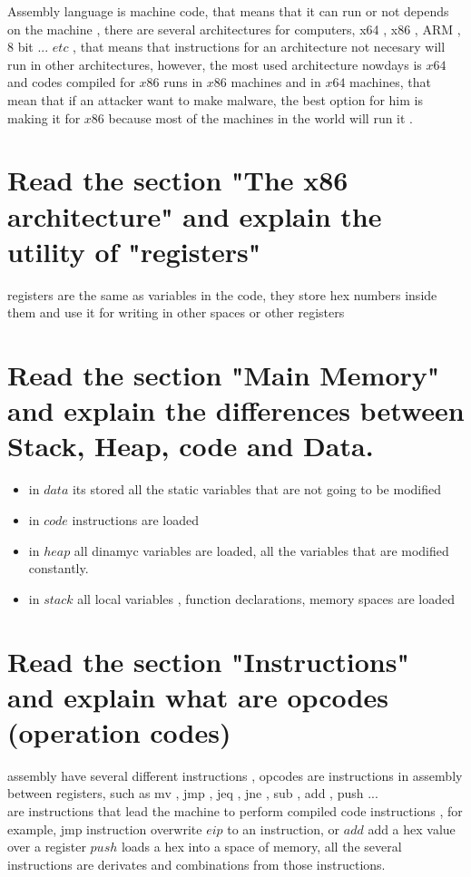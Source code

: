 \documentclass[10pt,a4paper]{article} %
\begin{document}
        Assembly language is machine code, that means that it can run or not
        depends on the machine , there are several architectures for computers,
        x64 , x86 , ARM , 8 bit ... $ etc  $  , that means that instructions
        for an architecture not necesary will run in other architectures,
        however, the most used architecture nowdays is $ x64  $  and codes
        compiled for $ x86  $ runs in $ x86  $ machines and in $ x64  $
        machines, that mean that if an attacker want to make malware, the best
        option for him is making it for $ x86  $ because most of the machines
        in the world will run it .

    \section{Read the section "The x86 architecture" and explain the utility of
    "registers"}
        registers are the same as variables in the code, they store hex numbers
        inside them and use it for writing in other spaces or other registers

    \section{Read the section "Main Memory" and explain the differences between
    Stack, Heap, code and Data.}
        \begin{itemize}
            \item {in $ data  $ its stored all the static variables that are not going to be modified}
            \item {in $ code  $  instructions are loaded}
            \item {in $ heap  $  all dinamyc variables are loaded, all the
                variables that are modified constantly.}
            \item {in $ stack  $  all local variables , function declarations,
                memory spaces are loaded}
        \end{itemize}

    \section{Read the section "Instructions" and explain what are opcodes
    (operation codes)}
        assembly have several different instructions , opcodes are instructions
        in assembly between registers, such as mv , jmp , jeq , jne , sub , add , push ...
        \\
        are instructions that lead the machine to perform compiled code
        instructions , for example, jmp instruction overwrite $ eip  $  to an
        instruction, or $ add  $ add a hex value over a register $ push  $ loads a hex into a space of memory, all the
        several instructions are derivates and combinations from those instructions.
\end{document}
